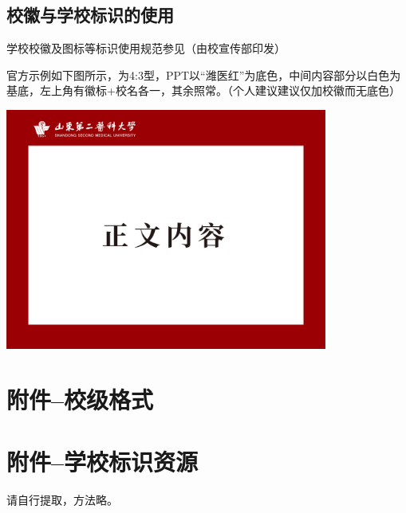 \subsection[校徽与学校标识的使用]{校徽与学校标识的使用}
学校校徽及图标等标识使用规范参见（由校宣传部印发）

官方示例如下图所示，为4:3型，PPT以“潍医红”\footnotemark 为底色，中间内容部分以白色为基底，左上角有徽标+校名各一，其余照常。（个人建议建议仅加校徽而无底色）

\begin{table}[H]
    \centering
    \includegraphics[height=300px]{ppt-内容.pdf}
\end{table}

\section[附件--校级格式]{附件--校级格式}


\section[附件--学校标识资源]{附件--学校标识资源}
请自行提取，方法略。

